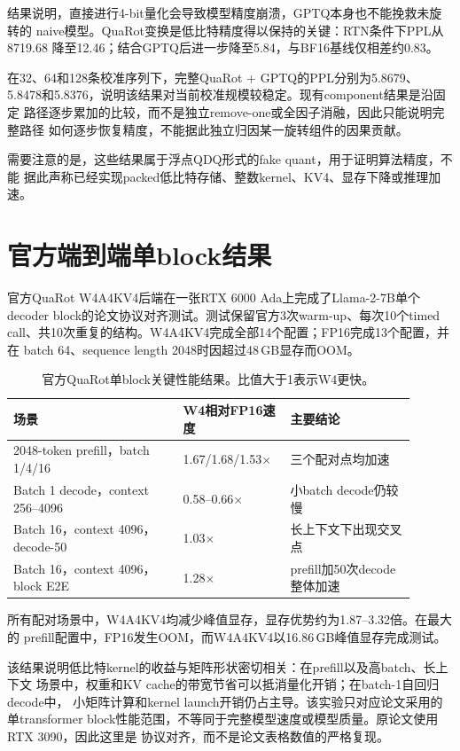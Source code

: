 \documentclass[11pt,a4paper]{ctexart}
\begin{document}
结果说明，直接进行4-bit量化会导致模型精度崩溃，GPTQ本身也不能挽救未旋转的
naive模型。QuaRot变换是低比特精度得以保持的关键：RTN条件下PPL从8719.68
降至12.46；结合GPTQ后进一步降至5.84，与BF16基线仅相差约0.83。

在32、64和128条校准序列下，完整QuaRot + GPTQ的PPL分别为5.8679、
5.8478和5.8376，说明该结果对当前校准规模较稳定。现有component结果是沿固定
路径逐步累加的比较，而不是独立remove-one或全因子消融，因此只能说明完整路径
如何逐步恢复精度，不能据此独立归因某一旋转组件的因果贡献。

需要注意的是，这些结果属于浮点QDQ形式的fake quant，用于证明算法精度，不能
据此声称已经实现packed低比特存储、整数kernel、KV4、显存下降或推理加速。

\section{官方端到端单block结果}

官方QuaRot W4A4KV4后端在一张RTX 6000 Ada上完成了Llama-2-7B单个
decoder block的论文协议对齐测试。测试保留官方3次warm-up、每次10个timed
call、共10次重复的结构。W4A4KV4完成全部14个配置；FP16完成13个配置，并在
batch 64、sequence length 2048时因超过48\,GB显存而OOM。

\begin{table}[htbp]
  \centering
  \small
  \begin{tabular}{@{}p{0.38\linewidth}p{0.24\linewidth}p{0.28\linewidth}@{}}
    \toprule
    场景 & W4相对FP16速度 & 主要结论 \\
    \midrule
    2048-token prefill，batch 1/4/16
      & 1.67/1.68/1.53$\times$
      & 三个配对点均加速 \\
    Batch 1 decode，context 256--4096
      & 0.58--0.66$\times$
      & 小batch decode仍较慢 \\
    Batch 16，context 4096，decode-50
      & 1.03$\times$
      & 长上下文下出现交叉点 \\
    Batch 16，context 4096，block E2E
      & 1.28$\times$
      & prefill加50次decode整体加速 \\
    \bottomrule
  \end{tabular}
  \caption{官方QuaRot单block关键性能结果。比值大于1表示W4更快。}
\end{table}

所有配对场景中，W4A4KV4均减少峰值显存，显存优势约为1.87--3.32倍。在最大的
prefill配置中，FP16发生OOM，而W4A4KV4以16.86\,GB峰值显存完成测试。

该结果说明低比特kernel的收益与矩阵形状密切相关：在prefill以及高batch、长上下文
场景中，权重和KV cache的带宽节省可以抵消量化开销；在batch-1自回归decode中，
小矩阵计算和kernel launch开销仍占主导。该实验只对应论文采用的单transformer
block性能范围，不等同于完整模型速度或模型质量。原论文使用RTX 3090，因此这里是
协议对齐，而不是论文表格数值的严格复现。
\end{document}
